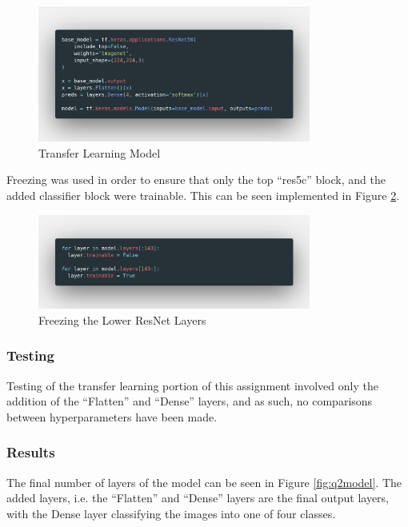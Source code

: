 \begin{figure}[H]
	\centering
	\includegraphics[width=0.8\textwidth]{images/Code/transfer}
	\caption{Transfer Learning Model}
	\label{fig:images-Code-transfer}
\end{figure}

Freezing was used in order to ensure that only the top ``res5c'' block, and the
added classifier block were trainable. This can be seen implemented in Figure
\ref{fig:freeze}.

\begin{figure}[H]
	\centering
	\includegraphics[width=0.8\textwidth]{images/Code/freeze}
	\caption{Freezing the Lower ResNet Layers}
	\label{fig:freeze}
\end{figure}

\subsubsection{Testing}

Testing of the transfer learning portion of this assignment involved only the
addition of the ``Flatten'' and ``Dense'' layers, and as such, no comparisons
between hyperparameters have been made.

\subsubsection{Results}

The final number of layers of the model can be seen in Figure \ref{fig:q2model}.
The added layers, i.e. the ``Flatten'' and ``Dense'' layers are the final output
layers, with the Dense layer classifying the images into one of four classes.

